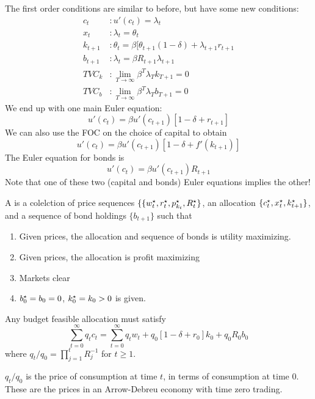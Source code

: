 \documentclass[10pt]{article}
\begin{document}
\begin{model}
	The first order conditions are similar to before, but have some new conditions:
	\begin{align*}
		c_t &: u'(c_t) = \lambda_t \\
		x_t &: \lambda_t = \theta_t \\
		k_{t+1} &: \theta_t = \beta [\theta_{t+1}(1-\delta) + \lambda_{t+1}r_{t+1} \\
		b_{t+1} &: \lambda_t = \beta R_{t+1} \lambda_{t+1} \\
		TVC_k &:\lim_{T\to\infty} \beta^T \lambda_T k_{T+1} = 0 \\
		TVC_b &:\lim_{T\to\infty} \beta^T \lambda_T b_{T+1} = 0 
	\end{align*}
	We end up with one main Euler equation: \[u'(c_t) = \beta u'(c_{t+1}) [1-\delta + r_{t+1}] \] We can also use the FOC on the choice of capital to obtain \[u'(c_t) = \beta u'(c_{t+1}) [1-\delta + f'(k_{t+1})]\] The Euler equation for bonds is \[u'(c_t) = \beta u'(c_{t+1}) R_{t+1}\]Note that one of these two (capital and bonds) Euler equations implies the other!
	\end{model}
	
	\begin{definition}
		A  is a colelction of price sequences $\{\{w_t^\star,r_t^\star,p_{k_t}^\star,R_t^\star\}$, an allocation $\{c_t^\star,x_t^\star,k_{t+1}^\star\}$, and a sequence of bond holdings $\{b_{t+1}\}$ such that
		\begin{enumerate}
			\item Given prices, the allocation and sequence of bonds is utility maximizing.
			\item Given prices, the allocation is profit maximizing
			\item Markets clear
			\item $b^\star_0 = b_0 = 0$, $k^\star_0 = k_0 > 0$ is given.
		\end{enumerate}
	\end{definition}
	
	\begin{proposition}
		Any budget feasible allocation must satisfy \[ \sum_{t=0}^\infty q_tc_t = \sum_{t=0}^\infty q_tw_t + q_0[1-\delta+r_0]k_0 + q_0R_0b_0\] where $q_t / q_0 = \prod_{j=1}^t R_j^{-1}$ for $t \ge 1$.
	\end{proposition}
	\begin{remark}
		$q_t / q_0$ is the price of consumption at time $t$, in terms of consumption at time 0. These are the prices in an Arrow-Debreu economy with time zero trading.
	\end{remark}
	
\end{document}
